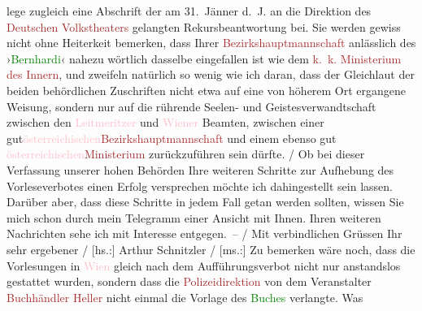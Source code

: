 {{{                        lege zugleich eine Abschrift der am 31. Jänner d. J. an die
                        Direktion des \textcolor{brown}{Deutschen Volkstheaters}
                        gelangten Rekursbeantwortung bei. Sie werden gewiss nicht ohne Heiterkeit
                        bemerken, dass Ihrer \textcolor{brown}{Bezirkshauptmannschaft} anlässlich des ›\textcolor{green}{Bernhardi}‹ nahezu wörtlich dasselbe eingefallen ist
                        wie dem \textcolor{brown}{k. k. Ministerium des Innern},
                        und zweifeln natürlich so wenig wie ich daran, dass der Gleichlaut der
                        beiden behördlichen Zuschriften nicht etwa auf eine von höherem Ort
                        ergangene Weisung, sondern nur auf die rührende Seelen- und
                        Geistesverwandtschaft zwischen den \textcolor{pink}{Leitmeritzer} und \textcolor{pink}{Wiener} Beamten,
                        zwischen einer gut\textcolor{pink}{österreichischen}\textcolor{brown}{Bezirkshauptmannschaft} und einem ebenso gut \textcolor{pink}{österreichischen}\textcolor{brown}{Ministerium}
                        zurückzuführen sein dürfte.{ / }Ob bei dieser Verfassung unserer hohen
                        Behörden Ihre weiteren Schritte zur Aufhebung des Vorleseverbotes einen
                        Erfolg versprechen möchte ich dahingestellt sein lassen. Darüber aber, dass
                        diese Schritte in jedem Fall getan werden sollten, wissen Sie mich schon
                        durch mein Telegramm einer Ansicht mit Ihnen. Ihren weiteren Nachrichten
                        sehe ich mit Interesse entgegen. –{ / }Mit verbindlichen Grüssen Ihr sehr ergebener{ / }{[}hs.:{]} Arthur Schnitzler { / }{[}ms.:{]} Zu bemerken wäre noch, dass die Vorlesungen
                        in \textcolor{pink}{Wien} gleich nach dem Aufführungsverbot
                        nicht nur anstandslos gestattet wurden, sondern dass die \textcolor{brown}{Polizeidirektion} von dem Veranstalter \textcolor{brown}{Buchhändler Heller} nicht einmal die Vorlage des \textcolor{green}{Buches} verlangte. Was
}}}
